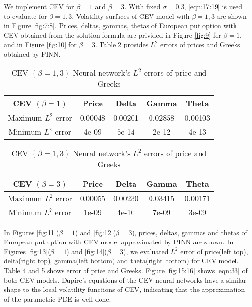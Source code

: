 \documentclass[11pt,reqno]{article}
\numberwithin{equation}{section}
\begin{document}
{We implement CEV for $\beta=1$ and $\beta=3$. 
With fixed $\sigma=0.3$, \eqref{eqn:17:19} is used to evaluate for $\beta=1, 3$.
Volatility surfaces of CEV model with $\beta=1,3$
   are shown in Figure \ref{fig:7:8}.
Prices, deltas, gammas, thetas of European put option with CEV
obtained from the solution formula
are privided 
in Figure \ref{fig:9} for $\beta=1$,
and in Figure \ref{fig:10} for $\beta=3$.
Table \ref{table:4:5} %
 provides $L^2$ errors of prices and Greeks obtained by PINN.
\begin{table}[H]\small
\centering
\begin{tabular}{|c|c|c|c|c|}
\hline
CEV $(\beta=1)$   & Price   & Delta   & Gamma   & Theta   \\ \hline
Maximum $L^2$ error & 0.00048 & 0.00201 & 0.02858 & 0.00103 \\ \hline
Minimum $L^2$ error & 4e-09   & 6e-14   & 2e-12   & 4e-13   \\ \hline
\end{tabular}
\begin{tabular}{|c|c|c|c|c|}
\hline
CEV $(\beta=3)$   & Price   & Delta   & Gamma   & Theta   \\ \hline
Maximum $L^2$ error & 0.00055 & 0.00230 & 0.03415 & 0.00171 \\ \hline
Minimum $L^2$ error & 1e-09   & 4e-10   & 7e-09   & 3e-09   \\ \hline
\end{tabular}
\caption{CEV $(\beta=1,3)$ Neural network’s $L^2$ errors of price and Greeks}
\label{table:4:5}
\end{table}
     
In Figures \ref{fig:11}($\beta=1$) and \ref{fig:12}($\beta=3$),
 prices, deltas, gammas and thetas of European put option with CEV model
  approximated by PINN are shown.
  In Figures \ref{fig:13}($\beta=1$) and \ref{fig:14}($\beta=3$),
   we evaluated $L^2$ error of price(left top), delta(right top), gamma(left bottom)
    and theta(right bottom) for CEV model.
     Table 4 and 5 shows error of price and Greeks. 
     Figure \ref{fig:15:16} shows \eqref{eqn:33} of both CEV models. 
 Dupire's equations of the CEV neural networks have a similar shape to the local volatility functions of CEV, indicating that the approximation of the parametric PDE is well done.

}
\end{document}
